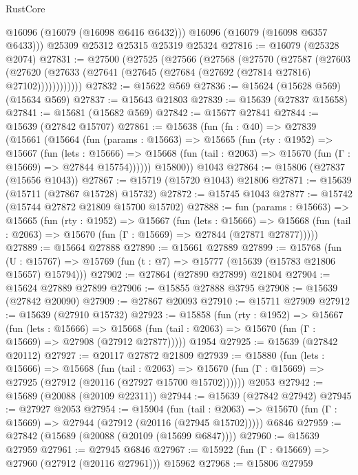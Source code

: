 \begin{lexlean}{RustCore}
\begin{coremodule}
        @16096
        (@16079 (@16098 @6416 @6432)))
      @16096
      (@16079 (@16098 @6357 @6433)))
    @25309
    @25312
    @25315
    @25319
    @25324
@27816 := @16079 (@25328 @2074)
@27831 := @27500
    (@27525
      (@27566
        (@27568
          (@27570
            (@27587
              (@27603
                (@27620 (@27633 (@27641 (@27645 (@27684 (@27692 (@27814 @27816) @27102))))))))))))
@27832 := @15622 @569
@27836 := @15624 (@15628 @569) (@15634 @569)
@27837 := @15643 @21803
@27839 := @15639 (@27837 @15658)
@27841 := @15681 (@15682 @569)
@27842 := @15677 @27841
@27844 := @15639 (@27842 @15707)
@27861 := @15638
    (fun (fn : @40) =>
    @27839
      (@15661
        (@15664
          (fun (params : @15663) =>
          @15665
            (fun (rty : @1952) =>
            @15667
              (fun (lets : @15666) =>
              @15668 (fun (tail : @2063) => @15670 (fun (Γ : @15669) => @27844 @15754))))))
        @15800))
    @1043
@27864 := @15806 (@27837 (@15656 @1043))
@27867 := @15719 (@15720 @1043) @21806
@27871 := @15639 (@15711 (@27867 @15728) @15732)
@27872 := @15745 @1043
@27877 := @15742 (@15744 @27872 @21809 @15700 @15702)
@27888 := fun (params : @15663) =>
  @15665
    (fun (rty : @1952) =>
    @15667
      (fun (lets : @15666) =>
      @15668 (fun (tail : @2063) => @15670 (fun (Γ : @15669) => @27844 (@27871 @27877)))))
@27889 := @15664 @27888
@27890 := @15661 @27889
@27899 := @15768
    (fun (U : @15767) => @15769 (fun (t : @7) => @15777 (@15639 (@15783 @21806 @15657) @15794)))
@27902 := @27864 (@27890 @27899) @21804
@27904 := @15624 @27889 @27899
@27906 := @15855 @27888 @3795
@27908 := @15639 (@27842 @20090)
@27909 := @27867 @20093
@27910 := @15711 @27909
@27912 := @15639 (@27910 @15732)
@27923 := @15858
    (fun (rty : @1952) =>
    @15667
      (fun (lets : @15666) =>
      @15668 (fun (tail : @2063) => @15670 (fun (Γ : @15669) => @27908 (@27912 @27877)))))
    @1954
@27925 := @15639 (@27842 @20112)
@27927 := @20117 @27872 @21809
@27939 := @15880
    (fun (lets : @15666) =>
    @15668
      (fun (tail : @2063) =>
      @15670 (fun (Γ : @15669) => @27925 (@27912 (@20116 (@27927 @15700 @15702))))))
    @2053
@27942 := @15689 (@20088 (@20109 @22311))
@27944 := @15639 (@27842 @27942)
@27945 := @27927 @2053
@27954 := @15904
    (fun (tail : @2063) => @15670 (fun (Γ : @15669) => @27944 (@27912 (@20116 (@27945 @15702)))))
    @6846
@27959 := @27842 (@15689 (@20088 (@20109 (@15699 @6847))))
@27960 := @15639 @27959
@27961 := @27945 @6846
@27967 := @15922 (fun (Γ : @15669) => @27960 (@27912 (@20116 @27961))) @15962
@27968 := @15806 @27959

\end{coremodule}
\end{lexlean}

